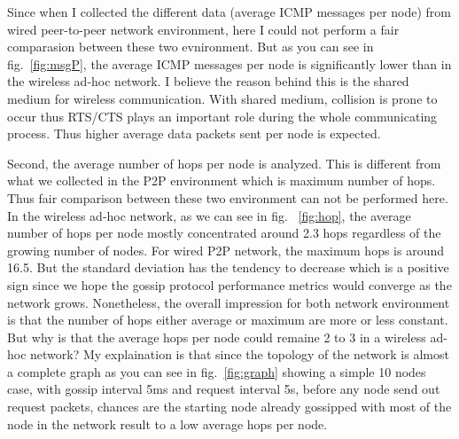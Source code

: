 Since when I collected the different data (average ICMP messages per node) from wired peer-to-peer network environment, here I could not perform a fair comparasion between these two evnironment. But as you can see in fig.~\ref{fig:msgP}, the average ICMP messages per node is significantly lower than in the wireless ad-hoc network. I believe the reason behind this is the shared medium for wireless communication. With shared medium, collision is prone to occur thus RTS/CTS plays an important role during the whole communicating process. Thus higher average data packets sent per node is expected.

Second, the average number of hops per node is analyzed. This is different from what we collected in the P2P environment which is maximum number of hops. Thus fair comparison between these two environment can not be performed here. In the wireless ad-hoc network, as we can see in fig. ~\ref{fig:hop}, the average number of hops per node mostly concentrated around 2.3 hops regardless of the growing number of nodes. For wired P2P network, the maximum hops is around 16.5. But the standard deviation has the tendency to decrease which is a positive sign since we hope the gossip protocol performance metrics would converge as the network grows. Nonetheless, the overall impression for both network environment is that the number of hops either average or maximum are more or less constant. But why is that the average hops per node could remaine 2 to 3 in a wireless ad-hoc network? My explaination is that since the topology of the network is almost a complete graph as you can see in fig.~\ref{fig:graph} showing a simple 10 nodes case, with gossip interval 5ms and request interval 5s, before any node send out request packets, chances are the starting node already gossipped with most of the node in the network result to a low average hops per node.

%
%

